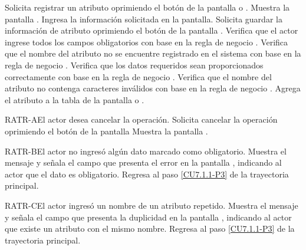 	\begin{UCtrayectoria}
		\UCpaso[\UCactor] Solicita registrar un atributo oprimiendo el botón  de la pantalla  o .
		\UCpaso[\UCsist] Muestra la pantalla .
		\UCpaso[\UCactor] Ingresa la información solicitada en la pantalla. \label{CU7.1.1-P3}
		\UCpaso[\UCactor] Solicita guardar la información de atributo oprimiendo el botón  de la pantalla . 
		\UCpaso[\UCsist] Verifica que el actor ingrese todos los campos obligatorios con base en la regla de negocio . 
		\UCpaso[\UCsist] Verifica que el nombre del atributo no se encuentre registrado en el sistema con base en la regla de negocio . 
		\UCpaso[\UCsist] Verifica que los datos requeridos sean proporcionados correctamente con base en la regla de negocio .  
		\UCpaso[\UCsist] Verifica que el nombre del atributo no contenga caracteres inválidos con base en la regla de negocio . 
		\UCpaso[\UCsist] Agrega el atributo a la tabla de la pantalla  o .
	\end{UCtrayectoria}		
	
	\begin{UCtrayectoriaA}{RATR-A}{El actor desea cancelar la operación.}
		\UCpaso[\UCactor] Solicita cancelar la operación oprimiendo el botón  de la pantalla 
		\UCpaso[\UCsist] Muestra la pantalla .
	\end{UCtrayectoriaA}

	\begin{UCtrayectoriaA}{RATR-B}{El actor no ingresó algún dato marcado como obligatorio.}
		\UCpaso[\UCsist] Muestra el mensaje  y señala el campo que presenta el error en la pantalla , indicando al actor que el dato es obligatorio.
		\UCpaso Regresa al paso \ref{CU7.1.1-P3} de la trayectoria principal.
	\end{UCtrayectoriaA}
	
	\begin{UCtrayectoriaA}{RATR-C}{El actor ingresó un nombre de un atributo repetido.}
		\UCpaso[\UCsist] Muestra el mensaje  y señala el campo que presenta la duplicidad en la pantalla , indicando al actor que existe un atributo con el mismo nombre.
		\UCpaso Regresa al paso \ref{CU7.1.1-P3} de la trayectoria principal.
	\end{UCtrayectoriaA}


